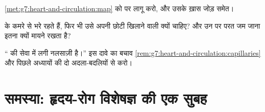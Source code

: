 \begin{exercise}[$\star\star$]\label{exo:g7:heart-and-circulation:10}
\cref{met:g7:heart-and-circulation:map} को  पर लागू करो, और
उसके ख़ास जोड़ समेत।
\end{exercise}

\begin{exercise}[$\star\star$]\label{exo:g7:heart-and-circulation:11}
 के कमरे  से भरे रहते हैं, फिर भी उसे अपनी छोटी खिलाने वाली
 क्यों चाहिए? और उन पर परत जम जाना इतना क्यों मायने रखता है?
\end{exercise}

\begin{exercise}[$\star\star\star$]\label{exo:g7:heart-and-circulation:12}
``  की सेवा में लगी नलसाज़ी है।'' इस दावे का बचाव
\cref{rem:g7:heart-and-circulation:capillaries} और पिछले अध्यायों की
दो अदला-बदलियों से करो।
\end{exercise}

\section{समस्या: हृदय-रोग विशेषज्ञ की एक सुबह}

